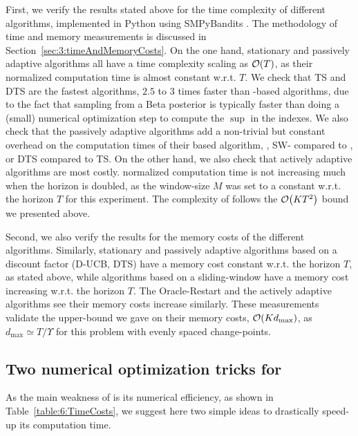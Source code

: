 First, we verify the results stated above for the time complexity of different algorithms, implemented in Python using SMPyBandits \cite{SMPyBandits}.
The methodology of time and memory measurements is discussed in Section~\ref{sec:3:timeAndMemoryCosts}.
On the one hand, stationary and passively adaptive algorithms all have a time complexity scaling as $\mathop{}\mathopen{}\mathcal{O}\mathopen{}\left(T\right)$, as their normalized computation time is almost constant w.r.t. $T$.
We check that TS and DTS are the fastest algorithms, $2.5$ to $3$ times faster than \klUCB-based algorithms, due to the fact that sampling from a Beta posterior is typically faster than doing a (small) numerical optimization step to compute the $\sup$ in the \klUCB{} indexes.
We also check that the passively adaptive algorithms add a non-trivial but constant overhead on the computation times of their based algorithm, \eg, SW-\klUCB{} compared to \klUCB, or DTS compared to TS.
On the other hand, we also check that actively adaptive algorithms are most costly.
\MklUCB{} normalized computation time is not increasing much when the horizon is doubled, as the window-size $M$ was set to a constant w.r.t. the horizon $T$ for this experiment.
The complexity of \GLRklUCB{} follows the $\mathop{}\mathopen{}\mathcal{O}\mathopen{}\left(K T^2\right)$ bound we presented above.

Second, we also verify the results for the memory costs of the different algorithms.
Similarly, stationary and passively adaptive algorithms based on a discount factor (D-UCB, DTS) have a memory cost constant w.r.t. the horizon $T$, as stated above,
while algorithms based on a sliding-window have a memory cost increasing w.r.t. the horizon $T$.
The Oracle-Restart and the actively adaptive algorithms see their memory costs increase similarly.
These measurements validate the upper-bound we gave on their memory costs, $\mathop{}\mathopen{}\mathcal{O}\mathopen{}\left(K d_{\max}\right)$, as $d_{\max} \simeq T / \Upsilon$ for this problem with evenly spaced change-points.


\subsection{Two numerical optimization tricks for \GLRklUCB}\label{sub:6:IdeasOptimizations}

As the main weakness of \GLRklUCB{} is its numerical efficiency, as shown in Table~\ref{table:6:TimeCosts},
we suggest here two simple ideas to drastically speed-up its computation time.

